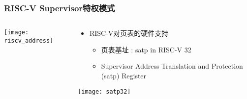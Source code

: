 \begin{frame}   
	\frametitle{RISC-V Supervisor特权模式}
	
	\begin{columns}[t]
		
		\begin{column}{.5\textwidth}
			
			\texttt{[image: riscv\_address]}
			
		\end{column}
		
		
		\begin{column}{.5\textwidth}
			
			\begin{itemize}\large
				\item RISC-V对页表的硬件支持
				\begin{itemize}
					\item 页表基址 \pause : satp in RISC-V 32
					\item  Supervisor Address Translation and Protection (satp) Register
					
							
				\end{itemize}
			\end{itemize}
			
			\texttt{[image: satp32]}
			
		\end{column}
		
		
	\end{columns}
	
\end{frame}


